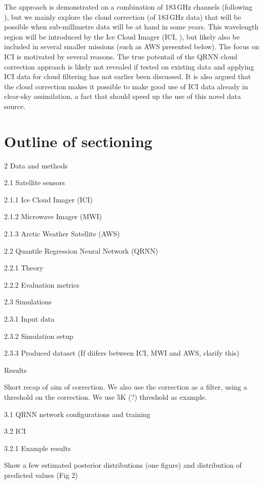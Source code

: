 \documentclass[amt, manuscript]{copernicus}
\begin{document}
The approach is demonstrated on a combination of 183\,GHz channels (following
\citet{buehler:aclou:07}), but we mainly explore the cloud correction (of
183\,GHz data) that will be possible when sub-millimetre data will be at hand
in some years. This wavelength region will be introduced by the Ice Cloud
Imager (ICI, \citet{eriksson:towar:20}), but likely also be included in several
smaller missions (such as AWS presented below). The focus on ICI is motivated
by several reasons. The true potentail of the QRNN cloud correction approach is
likely not revealed if tested on existing data and applying ICI data for cloud
filtering has not earlier been discussed. It is also argued that the cloud
correction makes it possible to make good use of ICI data already in clear-sky
assimilation, a fact that should speed up the use of this novel data source.



\newpage

\section*{Outline of sectioning}

2 Data and methods

2.1 Satellite sensors

2.1.1 Ice Cloud Imager (ICI)

2.1.2 Microwave Imager (MWI)

2.1.3 Arctic Weather Satellite (AWS)

2.2 Quantile Regression Neural Network (QRNN)

2.2.1 Theory

2.2.2 Evaluation metrics

2.3 Simulations

2.3.1 Input data

2.3.2 Simulation setup

2.3.3 Produced dataset
(If diifers between ICI, MWI and AWS, clarify this)

 Results

Short recap of aim of correction. We also use the correction as a filter, using
a threshold on the correction. We use 5K (?) threshold as example.

3.1 QRNN network configurations and training

3.2 ICI

3.2.1 Example results

Show a few estimated posterior distributions (one figure) and distribution of
predicted values (Fig 2)
\end{document}
